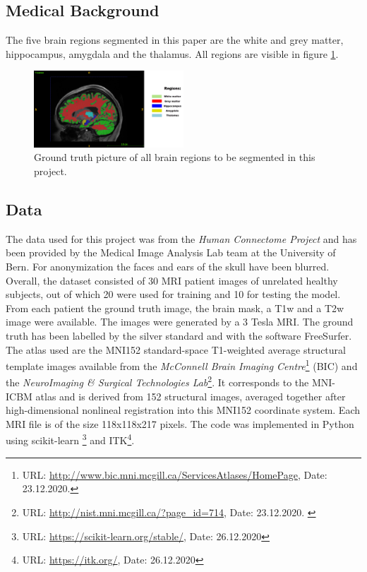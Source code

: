 \documentclass[journal]{IEEEtran}
\begin{document}
\subsection{Medical Background}
	The five brain regions segmented in this paper are the white and grey matter, hippocampus, amygdala and the thalamus. All regions are visible in figure \ref{fig:e1}.

	\begin{figure}[h]
		\centering
		\includegraphics[width=0.5\textwidth]{T1native_all_regions_labelled.png}
		\caption{Ground truth picture of all brain regions to be segmented in this project.}
		\label{fig:e1}
	\end{figure}

\subsection{Data}
	The data used for this project was from the {\itshape Human Connectome Project} and has been provided by the Medical Image Analysis Lab team at the University of Bern. For anonymization the faces and ears of the skull have been blurred. 
	Overall, the dataset consisted of 30 MRI patient images of unrelated healthy subjects, out of which 20 were used for training and 10 for testing the model. 
	From each patient the ground truth image, the brain mask, a T1w and a T2w image were available. The images were generated by a 3 Tesla MRI. 
	The ground truth has been labelled by the silver standard and with the software FreeSurfer.
	The atlas used are the MNI152 standard-space T1-weighted average structural template images available from the {\itshape McConnell Brain Imaging Centre}\footnote{URL: \url{http://www.bic.mni.mcgill.ca/ServicesAtlases/HomePage}, Date: 23.12.2020.} (BIC) and the {\itshape NeuroImaging \& Surgical Technologies Lab}\footnote{URL: \url{http://nist.mni.mcgill.ca/?page_id=714}, Date: 23.12.2020. \label{second}}. 
	It corresponds to the MNI-ICBM atlas and is derived from 152 structural images, averaged together after high-dimensional nonlineal registration into this MNI152 coordinate system.
	Each MRI file is of the size 118x118x217 pixels.\smallskip
	The code was implemented in Python using scikit-learn \footnote{URL: \url{https://scikit-learn.org/stable/}, Date: 26.12.2020} and ITK\footnote{URL: \url{https://itk.org/}, Date: 26.12.2020}.
		
\end{document}
